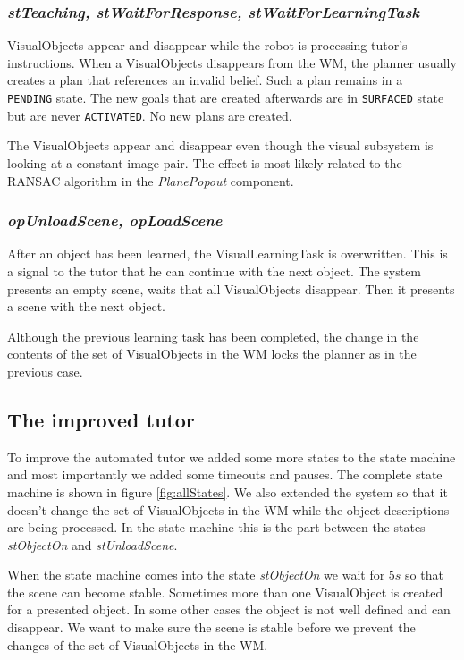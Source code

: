 \documentclass{article}
\begin{document}
\subsubsection*{\em stTeaching, stWaitForResponse, stWaitForLearningTask}

VisualObjects appear and disappear while the robot is processing tutor's
instructions. When a VisualObjects disappears from the WM, the planner usually
creates a plan that references an invalid belief. Such a plan remains in a {\tt
PENDING} state. The new goals that are created afterwards are in {\tt SURFACED}
state but are never {\tt ACTIVATED}. No new plans are created.

The VisualObjects appear and disappear even though the visual subsystem is
looking at a constant image pair. The effect is most likely related to the
RANSAC algorithm in the {\em PlanePopout} component.

\subsubsection*{\em opUnloadScene, opLoadScene}

After an object has been learned, the VisualLearningTask is overwritten. This
is a signal to the tutor that he can continue with the next object. The system
presents an empty scene, waits that all VisualObjects disappear. Then it
presents a scene with the next object.

Although the previous learning task has been completed, the change in the
contents of the set of VisualObjects in the WM locks the planner as in the
previous case.

\subsection{The improved tutor}

To improve the automated tutor we added some more states to the state machine
and most importantly we added some timeouts and pauses. The complete state
machine is shown in figure \ref{fig:allStates}. We also extended the system so
that it doesn't change the set of VisualObjects in the WM while the object
descriptions are being processed. In the state machine this is the part between
the states {\em stObjectOn} and {\em stUnloadScene}.

When the state machine comes into the state {\em stObjectOn} we wait for $5s$
so that the scene can become stable. Sometimes more than one VisualObject is
created for a presented object. In some other cases the object is not well
defined and can disappear. We want to make sure the scene is stable before we
prevent the changes of the set of VisualObjects in the WM.
\end{document}
